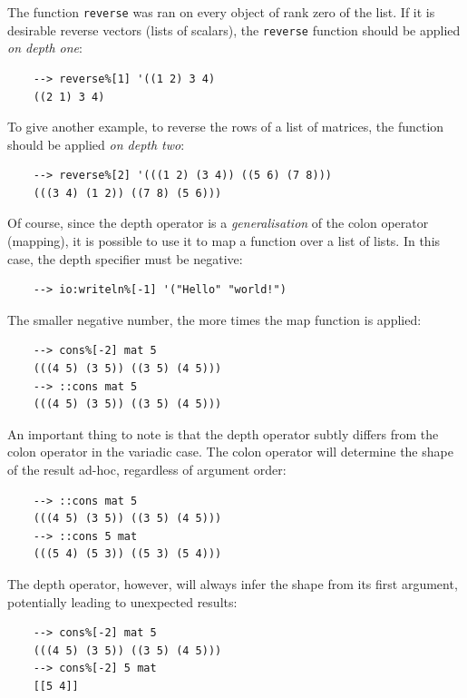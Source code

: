 The function \verb|reverse| was ran on every object of rank zero of the list. If it is desirable reverse vectors (lists of scalars), the \verb|reverse| function should be applied \textit{on depth one}:

\begin{Verbatim}
    --> reverse%[1] '((1 2) 3 4)
    ((2 1) 3 4)
\end{Verbatim}

To give another example, to reverse the rows of a list of matrices, the function should be applied \textit{on depth two}:

\begin{Verbatim}
    --> reverse%[2] '(((1 2) (3 4)) ((5 6) (7 8)))
    (((3 4) (1 2)) ((7 8) (5 6)))
\end{Verbatim}

Of course, since the depth operator is a \textit{generalisation} of the colon operator (mapping), it is possible to use it to map a function over a list of lists. In this case, the depth specifier must be negative:

\begin{Verbatim}
    --> io:writeln%[-1] '("Hello" "world!")
\end{Verbatim}

The smaller negative number, the more times the map function is applied:

\begin{Verbatim}
    --> cons%[-2] mat 5
    (((4 5) (3 5)) ((3 5) (4 5)))
    --> ::cons mat 5
    (((4 5) (3 5)) ((3 5) (4 5)))
\end{Verbatim}

An important thing to note is that the depth operator subtly differs from the colon operator in the variadic case. The colon operator will determine the shape of the result ad-hoc, regardless of argument order:

\begin{Verbatim}
    --> ::cons mat 5
    (((4 5) (3 5)) ((3 5) (4 5)))
    --> ::cons 5 mat
    (((5 4) (5 3)) ((5 3) (5 4)))
\end{Verbatim}

The depth operator, however, will always infer the shape from its first argument, potentially leading to unexpected results:

\begin{Verbatim}
    --> cons%[-2] mat 5
    (((4 5) (3 5)) ((3 5) (4 5)))
    --> cons%[-2] 5 mat
    [[5 4]]
\end{Verbatim}

